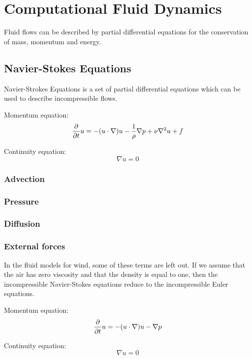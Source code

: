 \section{Computational Fluid Dynamics}

Fluid flows can be described by partial differential equations for the conservation 
of mass, momentum and energy. 

\subsection{Navier-Stokes Equations}

Navier-Strokes Equations is a set of partial differential equations which can be
used to describe incompressible flows\cite{fluidDynamicsIntro}. 

Momentum equation: 
$$\frac{\partial}{\partial t}u  = -(u \cdot \nabla)u - \frac{1}{\rho}\nabla p + \nu \nabla^2 u + f$$

Continuity equation:
$$\nabla u = 0$$

\subsubsection{Advection}

\subsubsection{Pressure}

\subsubsection{Diffusion}

\subsubsection{External forces}



In the fluid models for wind, some of these terms are left out. If we assume that 
the air has zero viscosity and that the density is equal to one, then the 
incompressible Navier-Stokes equations reduce to the incompressible Euler 
equations. 

Momentum equation: 
$$\frac{\partial}{\partial t}u  = -(u \cdot \nabla)u - \nabla p$$

Continuity equation:
$$\nabla u = 0$$
